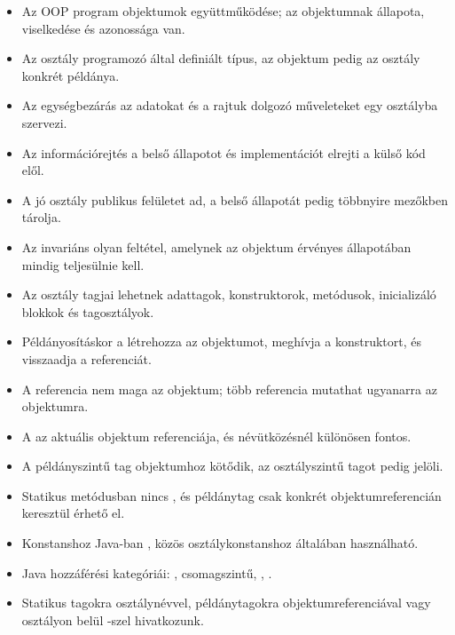\begin{itemize}
  \item Az OOP program objektumok együttműködése; az objektumnak állapota, viselkedése és azonossága van.
  \item Az osztály programozó által definiált típus, az objektum pedig az osztály konkrét példánya.
  \item Az egységbezárás az adatokat és a rajtuk dolgozó műveleteket egy osztályba szervezi.
  \item Az információrejtés a belső állapotot és implementációt elrejti a külső kód elől.
  \item A jó osztály publikus felületet ad, a belső állapotát pedig többnyire  mezőkben tárolja.
  \item Az invariáns olyan feltétel, amelynek az objektum érvényes állapotában mindig teljesülnie kell.
  \item Az osztály tagjai lehetnek adattagok, konstruktorok, metódusok, inicializáló blokkok és tagosztályok.
  \item Példányosításkor a  létrehozza az objektumot, meghívja a konstruktort, és visszaadja a referenciát.
  \item A referencia nem maga az objektum; több referencia mutathat ugyanarra az objektumra.
  \item A  az aktuális objektum referenciája, és névütközésnél különösen fontos.
  \item A példányszintű tag objektumhoz kötődik, az osztályszintű tagot pedig  jelöli.
  \item Statikus metódusban nincs , és példánytag csak konkrét objektumreferencián keresztül érhető el.
  \item Konstanshoz Java-ban , közös osztálykonstanshoz általában  használható.
  \item Java hozzáférési kategóriái: , csomagszintű, , .
  \item Statikus tagokra osztálynévvel, példánytagokra objektumreferenciával vagy osztályon belül -szel hivatkozunk.
\end{itemize}
